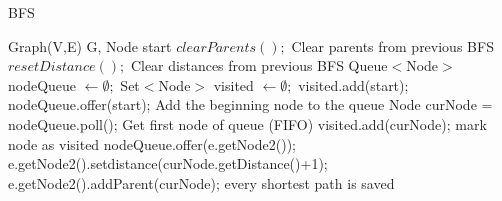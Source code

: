 \documentclass [12pt]{article}
\begin{document}
\begin{algorithm}[H]
  \caption{BFS}
  \label{BFS}
  \begin{algorithmic}[2]
    \Require Graph(V,E) G, Node start
    \State $clearParents();$ \Comment Clear parents from previous BFS
    \State $resetDistance();$ \Comment Clear distances from previous BFS
    \State Queue$<$Node$>$ nodeQueue $\gets \emptyset;$
    \State Set$<$Node$>$ visited $\gets \emptyset;$
    \State visited.add(start);
    \State nodeQueue.offer(start); \Comment Add the beginning node to the queue 
    \State Node curNode = nodeQueue.poll(); \Comment Get first node of queue (FIFO)
    \State visited.add(curNode); \Comment mark node as visited
              \State nodeQueue.offer(e.getNode2());
              \State e.getNode2().setdistance(curNode.getDistance()+1);
        \EndIf
              \State e.getNode2().addParent(curNode); \Comment every shortest path is saved 
        \EndIf
      \EndFor
    \EndWhile
  \end{algorithmic}
\end{algorithm}
\end{document}
